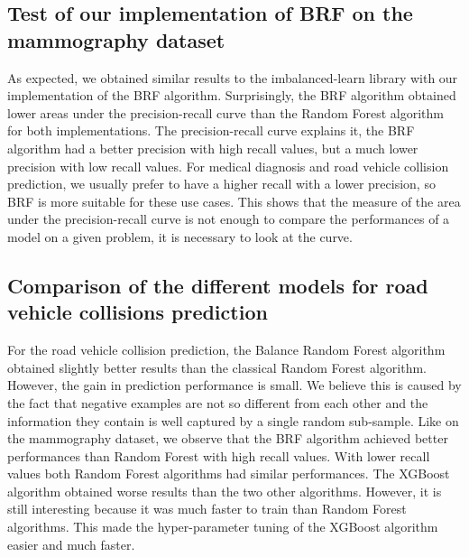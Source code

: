 \documentclass[conference]{IEEEtran}
\begin{document}
\subsection{Test of our implementation of BRF on the mammography dataset}
As expected, we obtained similar results to the imbalanced-learn library with our implementation of the BRF algorithm. Surprisingly, the BRF algorithm obtained lower areas under the precision-recall curve than the Random Forest algorithm for both implementations. The precision-recall curve explains it, the BRF algorithm had a better precision with high recall values, but a much lower precision with low recall values. For medical diagnosis and road vehicle collision prediction, we usually prefer to have a higher recall with a lower precision, so BRF is more suitable for these use cases. This shows that the measure of the area under the precision-recall curve is not enough to compare the performances of a model on a given problem, it is necessary to look at the curve. 

\subsection{Comparison of the different models for road vehicle collisions prediction}
For the road vehicle collision prediction, the Balance Random Forest algorithm obtained slightly better results than the classical Random Forest algorithm. However, the gain in prediction performance is small. 
We believe this is caused by the fact that negative examples are not so different from each other and the information they contain is well captured by a single random sub-sample. Like on the mammography dataset, we observe that the BRF algorithm achieved better performances than Random Forest with high recall values. With lower recall values both Random Forest algorithms had similar performances. The XGBoost algorithm obtained worse results than the two other algorithms. However, it is still interesting because it was much faster to train than Random Forest algorithms. This made the hyper-parameter tuning of the XGBoost algorithm easier and much faster.
\end{document}
